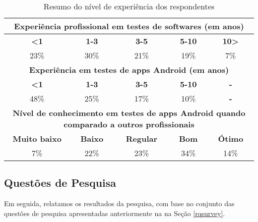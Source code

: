 \begin{table*}[htbp]
  \def \arraystretch{1}
  \footnotesize
  \caption{Resumo do nível de experiência dos respondentes}
    \begin{tabular}{ccccc}
    \toprule
    \multicolumn{5}{p{40em}}{\textbf{Experiência profissional em testes de softwares (em anos)}} \\
    \midrule
    \multicolumn{1}{c}{\textbf{<1}} & \textbf{1-3} & \textbf{3-5} & \textbf{5-10} & \multicolumn{1}{p{5em}}{\textbf{10>}} \\
    \midrule
    23\%  & 30\%  & 21\%  & 19\%  & 7\% \\
    \midrule
    \multicolumn{5}{p{40em}}{\textbf{Experiência em testes de apps Android (em anos)}} \\
    \midrule
    \multicolumn{1}{c}{\textbf{<1}} & \textbf{1-3} & \textbf{3-5} & \textbf{5-10} & \multicolumn{1}{c}{\textbf{-}} \\
    \midrule
    48\%  & 25\%  & 17\%  & 10\%  & \multicolumn{1}{p{5em}}{\textbf{-}} \\
    \midrule
    \multicolumn{5}{p{40em}}{\textbf{Nível de conhecimento em testes de apps Android quando comparado a outros profissionais}} \\
    \midrule
    \multicolumn{1}{p{5.3em}}{\textbf{Muito baixo}} & \multicolumn{1}{p{5.3em}}{\textbf{Baixo}} & \multicolumn{1}{p{5.3em}}{\textbf{Regular}} & \multicolumn{1}{p{5.3em}}{\textbf{Bom}} & \multicolumn{1}{p{5.3em}}{\textbf{Ótimo}} \\
    \midrule
    7\%   & 22\%  & 23\%  & 34\%  & 14\% \\
    \bottomrule
    \end{tabular}%
  \label{tab:professionalinformation}%
\end{table*}

\subsection{Questões de Pesquisa}

Em seguida, relatamos os resultados da pesquisa, com base no conjunto das questões de pesquisa apresentadas anteriormente na na Seção \ref{rqsurvey}.

